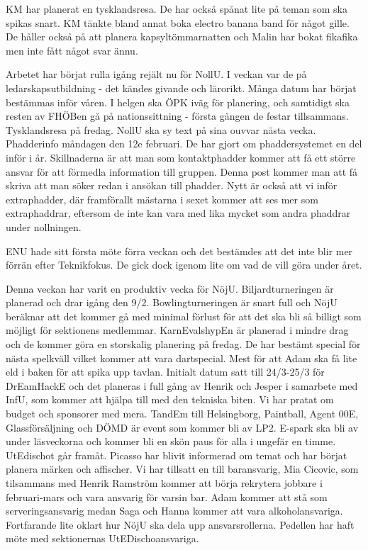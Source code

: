 \documentclass[10pt]{article}
\begin{document}
\begin{paragrafer}
\begin{paragrafer}
KM har planerat en tysklandsresa. De har också spånat lite på teman som ska spikas snart. KM tänkte bland annat boka electro banana band för något gille. De håller också på att planera kapsyltömmarnatten och Malin har bokat fikafika men inte fått något svar ännu.

Arbetet har börjat rulla igång rejält nu för NollU. I veckan var de på ledarskapsutbildning - det kändes givande och lärorikt. Många datum har börjat bestämmas inför våren. I helgen ska ÖPK iväg för planering, och samtidigt ska resten av FHÖBen gå på nationssittning - första gången de festar tillsammans. Tysklandsresa på fredag. NollU ska sy text på sina ouvvar nästa vecka. Phadderinfo måndagen den 12e februari. De har gjort om phaddersystemet en del inför i år. Skillnaderna är att man som kontaktphadder kommer att få ett större ansvar för att förmedla information till gruppen. Denna post kommer man att få skriva att man söker redan i ansökan till phadder. Nytt är också att vi inför extraphadder, där framförallt mästarna i sexet kommer att ses mer som extraphaddrar, eftersom de inte kan vara med lika mycket som andra phaddrar under nollningen.

ENU hade sitt första möte förra veckan och det bestämdes att det inte blir mer förrän efter Teknikfokus. De gick dock igenom lite om vad de vill göra under året.

Denna veckan har varit en produktiv vecka för NöjU. Biljardturneringen är planerad och drar igång den 9/2. Bowlingturneringen är snart full och NöjU beräknar att det kommer gå med minimal förlust för att det ska bli så billigt som möjligt för sektionens medlemmar. KarnEvalshypEn är planerad i mindre drag och de kommer göra en storskalig planering på fredag. De har bestämt special för nästa spelkväll vilket kommer att vara dartspecial. Mest för att Adam ska få lite eld i baken för att spika upp tavlan. Initialt datum satt till 24/3-25/3 för DrEamHackE och det planeras i full gång av Henrik och Jesper i samarbete med InfU, som kommer att hjälpa till med den tekniska biten. Vi har pratat om budget och sponsorer med mera. TandEm till Helsingborg, Paintball, Agent 00E, Glassförsäljning och DÖMD är event som kommer bli av LP2. E-spark ska bli av under läsveckorna och kommer bli en skön paus för alla i ungefär en timme. UtEdischot går framåt. Picasso har blivit informerad om temat och har börjat planera märken och affischer. Vi har tillsatt en till baransvarig, Mia Cicovic, som tilsammans med Henrik Ramström kommer att börja rekrytera jobbare i februari-mars och vara ansvarig för varsin bar. Adam kommer att stå som serveringsansvarig medan Saga och Hanna kommer att vara alkoholansvariga. Fortfarande lite oklart hur NöjU ska dela upp ansvarsrollerna. Pedellen har haft möte med sektionernas UtEDischoansvariga.


\end{paragrafer}
\end{paragrafer}
\end{document}
